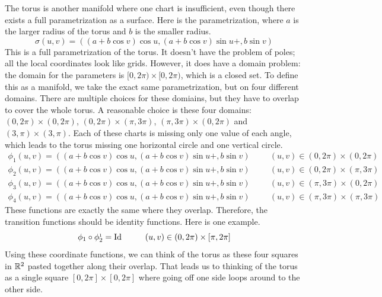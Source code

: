 \documentclass[fleqn,letterpaper]{report}
\begin{document}
\begin{example}
The torus is another manifold where one chart is insufficient,
even though there exists a full parametrization as a surface.
Here is the parametrization, where $a$ is the larger radius of
the torus and $b$ is the smaller radius.
\begin{equation*}
\sigma(u,v) = ((a + b \cos v) \cos u, (a + b \cos v) \sin u +
, b \sin v)
\end{equation*}
This is a full parametrization of the torus. It doesn't have
the problem of poles; all the local coordinates look like
grids. However, it does have a domain problem: the domain for
the parameters is $[0, 2\pi) \times [0,2\pi)$, which is a
closed set. To define this as a manifold, we take the exact
same parametrization, but on four different domains. There are
multiple choices for these domiains, but they have to overlap
to cover the whole torus. A reasonable choice is these four
domains: $(0,2\pi) \times (0,2\pi)$, $(0,2\pi) \times
(\pi,3\pi)$, $(\pi, 3\pi) \times (0, 2\pi)$ and $(3,\pi)
\times (3,\pi)$. Each of these charts is missing only one
value of each angle, which leads to the torus missing one
horizontal circle and one vertical circle. 
\begin{align*}
\phi_1(u,v) = ((a + b \cos v) \cos u, (a + b \cos v) \sin u +
, b \sin v) \hspace{1cm} (u,v) \in (0,2\pi) \times (0,2\pi) \\
\phi_2(u,v) = ((a + b \cos v) \cos u, (a + b \cos v) \sin u +
, b \sin v) \hspace{1cm} (u,v) \in (0,2\pi) \times (\pi,3\pi) \\
\phi_3(u,v) = ((a + b \cos v) \cos u, (a + b \cos v) \sin u +
, b \sin v) \hspace{1cm} (u,v) \in (\pi,3\pi) \times (0,2\pi) \\
\phi_4(u,v) = ((a + b \cos v) \cos u, (a + b \cos v) \sin u +
, b \sin v) \hspace{1cm} (u,v) \in (\pi,3\pi) \times (\pi,3\pi) 
\end{align*}
These functions are exactly the same where they overlap.
Therefore, the transition functions should be identity
functions. Here is one example.
\begin{equation*}
\phi_1 \circ \phi_2^{_1} = \mathrm{Id} \hspace{1cm} (u,v) \in
(0,2\pi) \times [\pi, 2\pi] 
\end{equation*}
Using these coordinate functions, we can think of the torus as
these four squares in $\mathbb{R}^2$ pasted together along their
overlap. That leads us to thinking of the torus as a single
square $[0,2\pi] \times [0,2\pi]$ where going off one side
loops around to the other side.
\end{example}
\end{document}
